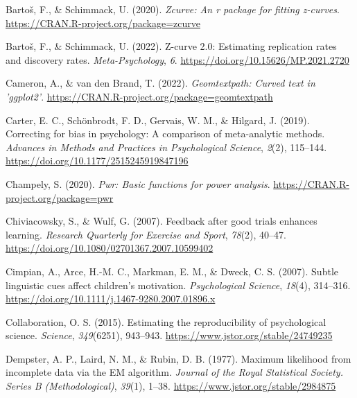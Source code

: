 \documentclass[
  man, donotrepeattitle,floatsintext]{apa7}
\newlength{\cslhangindent}
\newlength{\cslentryspacingunit} %
\newenvironment{CSLReferences}[2] %
 {%
  \setlength{\parindent}{0pt}
  \ifodd #1
  \let\oldpar\par
  \def\par{\hangindent=\cslhangindent\oldpar}
  \fi
  \setlength{\parskip}{#2\cslentryspacingunit}
 }%
 {}
\begin{document}
\begin{CSLReferences}{1}{0}
\leavevmode{}%
Bartoš, F., \& Schimmack, U. (2020). \emph{Zcurve: An r package for fitting z-curves}. \url{https://CRAN.R-project.org/package=zcurve}

\leavevmode{}%
Bartoš, F., \& Schimmack, U. (2022). Z-curve 2.0: Estimating replication rates and discovery rates. \emph{Meta-Psychology}, \emph{6}. \url{https://doi.org/10.15626/MP.2021.2720}

\leavevmode{}%
Cameron, A., \& van den Brand, T. (2022). \emph{Geomtextpath: Curved text in 'ggplot2'}. \url{https://CRAN.R-project.org/package=geomtextpath}

\leavevmode{}%
Carter, E. C., Schönbrodt, F. D., Gervais, W. M., \& Hilgard, J. (2019). Correcting for bias in psychology: A comparison of meta-analytic methods. \emph{Advances in Methods and Practices in Psychological Science}, \emph{2}(2), 115--144. \url{https://doi.org/10.1177/2515245919847196}

\leavevmode{}%
Champely, S. (2020). \emph{Pwr: Basic functions for power analysis}. \url{https://CRAN.R-project.org/package=pwr}

\leavevmode{}%
Chiviacowsky, S., \& Wulf, G. (2007). Feedback after good trials enhances learning. \emph{Research Quarterly for Exercise and Sport}, \emph{78}(2), 40--47. \url{https://doi.org/10.1080/02701367.2007.10599402}

\leavevmode{}%
Cimpian, A., Arce, H.-M. C., Markman, E. M., \& Dweck, C. S. (2007). Subtle linguistic cues affect children's motivation. \emph{Psychological Science}, \emph{18}(4), 314--316. \url{https://doi.org/10.1111/j.1467-9280.2007.01896.x}

\leavevmode{}%
Collaboration, O. S. (2015). Estimating the reproducibility of psychological science. \emph{Science}, \emph{349}(6251), 943--943. \url{https://www.jstor.org/stable/24749235}

\leavevmode{}%
Dempster, A. P., Laird, N. M., \& Rubin, D. B. (1977). Maximum likelihood from incomplete data via the {EM} algorithm. \emph{Journal of the Royal Statistical Society. Series B (Methodological)}, \emph{39}(1), 1--38. \url{https://www.jstor.org/stable/2984875}


\end{CSLReferences}
\end{document}
